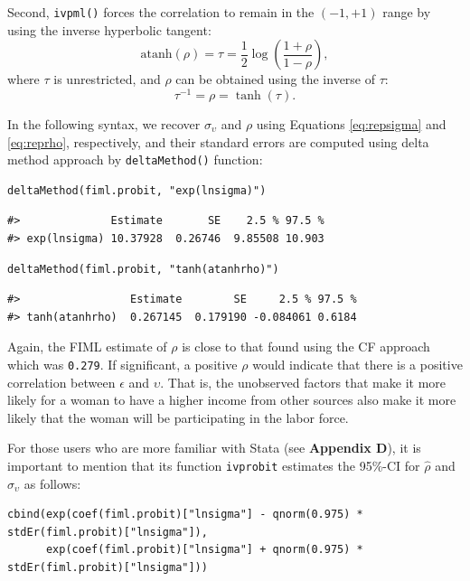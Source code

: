 Second, \texttt{ivpml()} forces the correlation to remain in the \((-1, +1)\) range by using the inverse hyperbolic tangent:
\begin{equation*}
\textrm{atanh}(\rho) = \tau = \frac{1}{2}\log\left(\frac{1 +  \rho}{1 - \rho}\right),
\end{equation*}
where \(\tau\) is unrestricted, and \(\rho\) can be obtained using the inverse of \(\tau\):
\begin{equation}
\tau ^{-1} = \rho = \tanh(\tau).
  \label{eq:reprho}
\end{equation}

In the following syntax, we recover \(\sigma_{\upsilon}\) and \(\rho\) using Equations \eqref{eq:repsigma} and \eqref{eq:reprho}, respectively, and their standard errors are computed using delta method approach by \texttt{deltaMethod()} function:

\begin{verbatim}
deltaMethod(fiml.probit, "exp(lnsigma)")
\end{verbatim}

\begin{verbatim}
#>              Estimate       SE    2.5 % 97.5 %
#> exp(lnsigma) 10.37928  0.26746  9.85508 10.903
\end{verbatim}

\begin{verbatim}
deltaMethod(fiml.probit, "tanh(atanhrho)")
\end{verbatim}

\begin{verbatim}
#>                 Estimate        SE     2.5 % 97.5 %
#> tanh(atanhrho)  0.267145  0.179190 -0.084061 0.6184
\end{verbatim}

Again, the FIML estimate of \(\rho\) is close to that found using the CF approach which was \texttt{0.279}. If significant, a positive \(\rho\) would indicate that there is a positive correlation between \(\epsilon\) and \(\upsilon\). That is, the unobserved factors that make it more likely for a woman to have a higher income from other sources also make it more likely that the woman will be participating in the labor force.

For those users who are more familiar with Stata (see \textbf{Appendix D}), it is important to mention that its function \texttt{ivprobit} estimates the 95\%-CI for \(\widehat{\rho}\) and \(\widehat{\sigma}_{\upsilon}\) as follows:

\begin{verbatim}
cbind(exp(coef(fiml.probit)["lnsigma"] - qnorm(0.975) * stdEr(fiml.probit)["lnsigma"]), 
      exp(coef(fiml.probit)["lnsigma"] + qnorm(0.975) * stdEr(fiml.probit)["lnsigma"]))
\end{verbatim}

